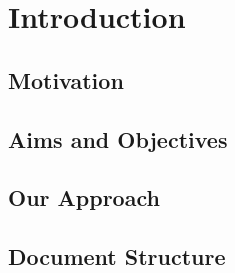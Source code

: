 \chapter{Introduction}





\section{Motivation} %



\section{Aims and Objectives} 
\blindtext

\section{Our Approach} 
\blindtext

\section{Document Structure}
\blindtext
